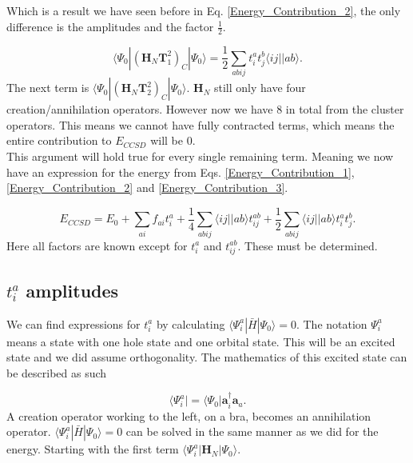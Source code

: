 \documentclass[a4paper,norsk,11pt,twoside]{report}
\begin{document}
Which is a result we have seen before in Eq. \eqref{Energy_Contribution_2}, the only difference is the amplitudes and the factor $\frac{1}{2}$.

\begin{equation}
\langle \Psi_0 | (\textbf{H}_N \textbf{T}_1^2)_C | \Psi_0 \rangle = \frac{1}{2} \sum_{abij} t_{i}^{a} t_j^b \langle ij||ab \rangle . \label{Energy_Contribution_3}
\end{equation}
The next term is $\langle \Psi_0 | (\textbf{H}_N \textbf{T}_2^2)_C | \Psi_0 \rangle$. $\textbf{H}_N$ still only have four creation/annihilation operators. However now we have 8 in total from the cluster operators. This means we cannot have fully contracted terms, which means the entire contribution to $E_{CCSD}$ will be 0. \\

This argument will hold true for every single remaining term. Meaning we now have an expression for the energy from Eqs. \eqref{Energy_Contribution_1}, \eqref{Energy_Contribution_2} and \eqref{Energy_Contribution_3}.

\begin{equation}
E_{CCSD} = E_0 + \sum_{ai} f_{ai} t_i^a + \frac{1}{4} \sum_{abij} \langle ij||ab \rangle t_{ij}^{ab} + \frac{1}{2} \sum_{abij} \langle ij || ab \rangle t_i^a t_j^b . \label{CCSD_TOTAL_ENERGY}
\end{equation}
Here all factors are known except for $t_i^a$ and $t_{ij}^{ab}$. These must be determined.

\subsection{$t_i^a$ amplitudes}
We can find expressions for $t_i^a$ by calculating $\langle \Psi_i^a | \bar{H} | \Psi_0 \rangle = 0$. The notation $\Psi_i^a$ means a state with one hole state and one orbital state. This will be an excited state and we did assume orthogonality. The mathematics of this excited state can be described as such

\begin{equation}
\langle \Psi_i^a | = \langle \Psi_0 | \textbf{a}^{\dag}_i \textbf{a}_a . \label{first_excited_stats}
\end{equation}
A creation operator working to the left, on a bra, becomes an annihilation operator. $\langle \Psi_i^a | \bar{H} | \Psi_0 \rangle = 0$ can be solved in the same manner as we did for the energy. Starting with the first term $\langle \Psi_i^a | \textbf{H}_N | \Psi_0 \rangle$.
\end{document}
